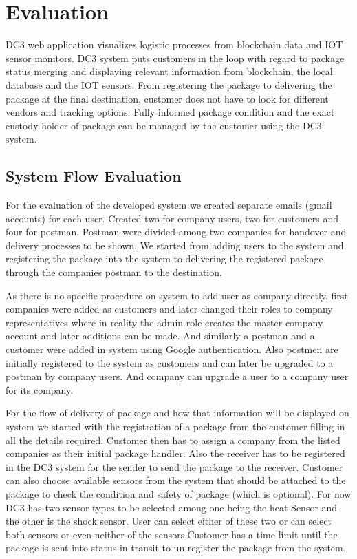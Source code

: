 \chapter{Evaluation}
\label{cha:evaluation}

DC3 web application visualizes logistic processes from blockchain data and IOT sensor monitors. DC3 system puts customers in the loop with regard to package status merging and displaying relevant information from blockchain, the local database and the IOT sensors. From registering the package to delivering the package at the final destination, customer does not have to look for different vendors and tracking options. Fully informed package condition and the exact custody holder of package can be managed by the customer using the DC3 system.
\section{System Flow Evaluation}
For the evaluation of the developed system we created separate emails (gmail accounts) for each user. Created two for company users, two for customers and four for postman. Postman were divided among two companies for handover and delivery processes to be shown. We started from adding users to the system and registering the package into the system to delivering the registered package through the companies postman to the destination.

As there is no specific procedure on system to add user as company directly, first companies were added as customers and later changed their roles to company representatives where in reality the admin role creates the master company account and later additions can be made. And similarly a postman and a customer were added in system using Google authentication. Also postmen are initially registered to the system as customers and can later be upgraded to a postman by company users. And company can upgrade a user to a company user for its company.

For the flow of delivery of package and how that information will be displayed on system we started with the registration of a package from the customer filling in all the details required. Customer then has to assign a company from the listed companies as their initial package handler. Also the receiver has to be registered in the DC3 system for the sender to send the package to the receiver. Customer can also choose available sensors from the system that should be attached to the package to check the condition and safety of package (which is optional). For now DC3 has two sensor types to be selected among one being the heat Sensor and the other is the shock sensor. User can select either of these two or can select both sensors or even neither of the sensors.Customer has a time limit until the package is sent into status in-transit to  un-register the package from the system.

